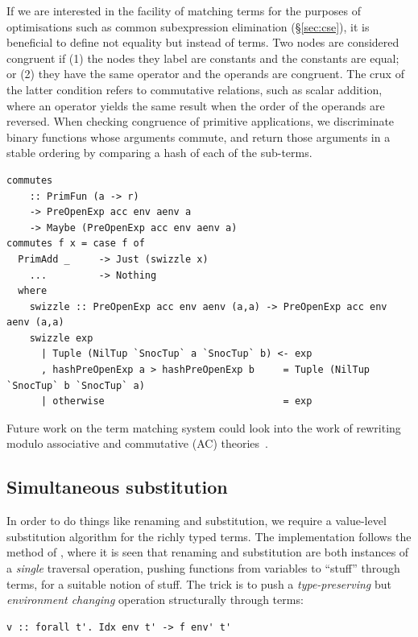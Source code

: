 If we are interested in the facility of matching terms for the purposes of
optimisations such as common subexpression elimination (\S\ref{sec:cse}), it is
beneficial to define not equality but instead  of terms. Two
nodes are considered congruent if (1) the nodes they label are constants and the
constants are equal; or (2) they have the same operator and the operands are
congruent. The crux of the latter condition refers to commutative relations,
such as scalar addition, where an operator yields the same result when the order
of the operands are reversed. When checking congruence of primitive applications,
we discriminate binary functions whose arguments commute, and return those
arguments in a stable ordering by comparing a hash of each of the sub-terms.
%
\begin{lstlisting}[style=haskell]
commutes
    :: PrimFun (a -> r)
    -> PreOpenExp acc env aenv a
    -> Maybe (PreOpenExp acc env aenv a)
commutes f x = case f of
  PrimAdd _     -> Just (swizzle x)
    ...         -> Nothing
  where
    swizzle :: PreOpenExp acc env aenv (a,a) -> PreOpenExp acc env aenv (a,a)
    swizzle exp
      | Tuple (NilTup `SnocTup` a `SnocTup` b) <- exp
      , hashPreOpenExp a > hashPreOpenExp b     = Tuple (NilTup `SnocTup` b `SnocTup` a)
      | otherwise                               = exp
\end{lstlisting}
%
Future work on the term matching system could look into the work of rewriting
modulo associative and commutative (AC)
theories~\cite{Kirchner:2001ww,Eker:1995ts,Eker:2002vd,Eker:2003ef,Belkhir:2011dd}.


\subsection{Simultaneous substitution}
\label{sec:substitution}

In order to do things like renaming and substitution, we require a value-level
substitution algorithm for the richly typed terms. The implementation follows
the method of \citet{McBride:2006up,McBride:2005jv}, where it is seen that
renaming and substitution are both instances of a \emph{single} traversal
operation, pushing functions from variables to ``stuff'' through terms, for a
suitable notion of stuff.
%
The trick is to push a \emph{type-preserving} but \emph{environment changing}
operation structurally through terms:
%
\begin{lstlisting}[style=haskell]
v :: forall t'. Idx env t' -> f env' t'
\end{lstlisting}

